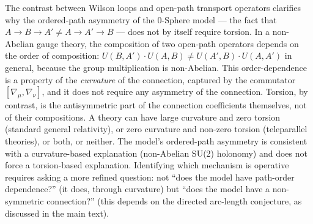 \documentclass[%
 reprint,
 amsmath,amssymb,
 aps,
 prb,
]{revtex4-2}
\numberwithin{equation}{section}
\begin{document}
The contrast between Wilson loops and open-path transport operators clarifies why the ordered-path asymmetry of the 0-Sphere model --- the fact that $A\to B\to A' \neq A\to A'\to B$ --- does not by itself require torsion. In a non-Abelian gauge theory, the composition of two open-path operators depends on the order of composition: $U(B,A')\cdot U(A,B) \neq U(A',B)\cdot U(A,A')$ in general, because the group multiplication is non-Abelian. This order-dependence is a property of the \emph{curvature} of the connection, captured by the commutator $[\nabla_\mu, \nabla_\nu]$, and it does not require any asymmetry of the connection. Torsion, by contrast, is the antisymmetric part of the connection coefficients themselves, not of their compositions. A theory can have large curvature and zero torsion (standard general relativity), or zero curvature and non-zero torsion (teleparallel theories), or both, or neither. The model's ordered-path asymmetry is consistent with a curvature-based explanation (non-Abelian SU(2) holonomy) and does not force a torsion-based explanation. Identifying which mechanism is operative requires asking a more refined question: not ``does the model have path-order dependence?'' (it does, through curvature) but ``does the model have a non-symmetric connection?'' (this depends on the directed arc-length conjecture, as discussed in the main text).
\end{document}
